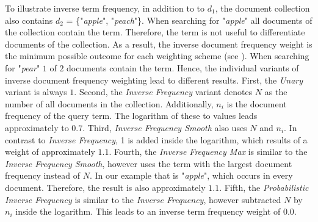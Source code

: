 To illustrate inverse term frequency, in addition to to $d_1$, the document collection also contains $d_2$ = \{"\textit{apple}", "\textit{peach}"\}. When searching for "\textit{apple}" all documents of the collection contain the term. Therefore, the term is not useful to differentiate documents of the collection. As a result, the inverse document frequency weight is the minimum possible outcome for each weighting scheme (see ). When searching for "\textit{pear}" $1$ of $2$ documents contain the term. Hence, the individual variants of inverse document frequency weighting lead to different results. First, the \textit{Unary} variant is always $1$. Second, the \textit{Inverse Frequency} variant denotes $N$ as the number of all documents in the collection. Additionally, $n_i$ is the document frequency of the query term. The logarithm of these to values leads approximately to $0.7$. Third, \textit{Inverse Frequency Smooth} also uses $N$ and $n_i$. In contrast to \textit{Inverse Frequency}, 1 is added inside the logarithm, which results of a weight of approximately $1.1$. Fourth, the \textit{Inverse Frequency Max} is similar to the \textit{Inverse Frequency Smooth}, however uses the term with the largest document frequency instead of $N$. In our example that is "\textit{apple}", which occurs in every document. Therefore, the result is also approximately $1.1$. Fifth, the \textit{Probabilistic Inverse Frequency} is similar to the \textit{Inverse Frequency}, however subtracted $N$ by $n_i$ inside the logarithm. This leads to an inverse term frequency weight of $0.0$.

